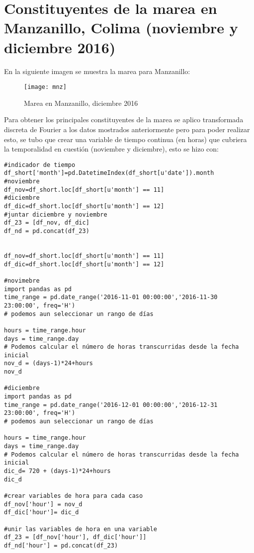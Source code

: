 \documentclass[12pt,letterpaper]{article}
\begin{document}
\section{Constituyentes de la marea en Manzanillo, Colima (noviembre y diciembre 2016)}

En la siguiente imagen se muestra la marea para Manzanillo:

\begin{figure}[H]
	\centering	\texttt{[image: mnz]}
	\caption{Marea en Manzanillo, diciembre 2016}
\end{figure}

Para obtener los principales constituyentes de la marea se aplico transformada discreta de Fourier a los datos mostrados anteriormente pero para poder realizar esto, se tubo que crear una variable de tiempo continua (en horas) que cubriera la temporalidad en cuestión (noviembre y diciembre), esto se hizo con:

\begin{verbatim}
#indicador de tiempo
df_short['month']=pd.DatetimeIndex(df_short[u'date']).month
#noviembre
df_nov=df_short.loc[df_short[u'month'] == 11]
#diciembre
df_dic=df_short.loc[df_short[u'month'] == 12]
#juntar diciembre y noviembre
df_23 = [df_nov, df_dic]
df_nd = pd.concat(df_23)


df_nov=df_short.loc[df_short[u'month'] == 11]
df_dic=df_short.loc[df_short[u'month'] == 12]

#novimebre
import pandas as pd
time_range = pd.date_range('2016-11-01 00:00:00','2016-11-30 23:00:00', freq='H')
# podemos aun seleccionar un rango de días
 
hours = time_range.hour
days = time_range.day
# Podemos calcular el número de horas transcurridas desde la fecha inicial
nov_d = (days-1)*24+hours
nov_d

#diciembre
import pandas as pd
time_range = pd.date_range('2016-12-01 00:00:00','2016-12-31 23:00:00', freq='H')
# podemos aun seleccionar un rango de días
 
hours = time_range.hour
days = time_range.day
# Podemos calcular el número de horas transcurridas desde la fecha inicial
dic_d= 720 + (days-1)*24+hours
dic_d

#crear variables de hora para cada caso
df_nov['hour'] = nov_d
df_dic['hour']= dic_d

#unir las variables de hora en una variable
df_23 = [df_nov['hour'], df_dic['hour']]
df_nd['hour'] = pd.concat(df_23)

\end{verbatim}
\end{document}

